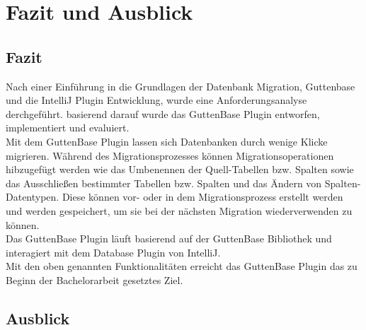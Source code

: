 \chapter{Fazit und Ausblick}

\section{Fazit}
Nach einer Einführung in die Grundlagen der Datenbank Migration, Guttenbase und die IntelliJ Plugin Entwicklung, wurde eine Anforderungsanalyse derchgeführt. basierend darauf wurde das GuttenBase Plugin entworfen, implementiert und evaluiert. \\
Mit dem GuttenBase Plugin lassen sich Datenbanken durch wenige Klicke migrieren. Während des Migrationsprozesses können Migrationsoperationen hibzugefügt werden wie das Umbenennen der Quell-Tabellen bzw. Spalten sowie das Ausschließen bestimmter Tabellen bzw. Spalten und das Ändern von Spalten-Datentypen. Diese können vor- oder in dem  Migrationsprozess erstellt werden und werden gespeichert, um sie bei der nächsten Migration wiederverwenden zu können.\\
Das GuttenBase Plugin läuft basierend auf der GuttenBase Bibliothek und interagiert mit dem Database Plugin von IntelliJ.\\
Mit den oben genannten Funktionalitäten erreicht das GuttenBase Plugin das zu Beginn der Bachelorarbeit gesetztes Ziel.
\section{Ausblick}
